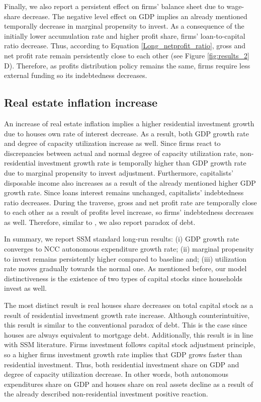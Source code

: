 \documentclass[11pt]{article}
\begin{document}
Finally, we also report a persistent effect on firms' balance sheet due to wage-share decrease.
The negative level effect on GDP implies an already mentioned temporally decrease in marginal propensity to invest.
As a consequence of the initially lower accumulation rate and higher profit share, firms' loan-to-capital ratio decrease.
Thus, according to Equation \ref{Long_netprofit_ratio}, gross and net profit rate remain persistently close to each other (see Figure \ref{fig:results_2} D).
Therefore, as profits distribution policy remains the same, firms require less external funding so its indebtedness decreases.


\subsection{Real estate inflation increase}
\label{sec:org183483f}
\label{sec:Exp2}


An increase of real estate inflation implies a higher residential investment growth due to houses own rate of interest decrease.
As a result, both GDP growth rate and degree of capacity utilization increase as well.
Since firms react to discrepancies between actual and normal degree of capacity utilization rate, non-residential investment growth rate 
is temporally higher than GDP growth rate due to marginal propensity to invest adjustment.
Furthermore, capitalists' disposable income also increases as a result of the already mentioned higher GDP growth rate.
Since loans interest remains unchanged, capitalists' indebtedness ratio decreases.
During the traverse, gross and net profit rate are temporally close to each other as a result of profits level increase, so firms' indebtedness decreases as well.
Therefore, similar to \textcite{mandarino-2020-worker-debt}, we also report paradox of debt.

In summary, we report SSM standard long-run results:
    (i) GDP growth rate converges to NCC autonomous expenditure growth rate;
    (ii) marginal propensity to invest remains persistently higher compared to baseline and;
    (iii) utilization rate moves gradually towards the normal one.
As mentioned before, our model distinctiveness is the existence of two types of capital stocks since households invest as well.


The most distinct result is real houses share decreases on total capital stock as a result of residential investment growth rate increase.
Although counterintuitive, this result is similar to the conventional paradox of debt.
This is the case since houses are always equivalent to  mortgage debt.
Additionally, this result is in line with SSM literature.
Firms investment follows capital stock adjustment principle, so a higher firms investment growth rate implies that
GDP grows faster than residential investment.
Thus, both residential investment share on GDP and degree of capacity  utilization decrease.
In other words, both autonomous expenditures share on GDP and houses share on real assets decline as a result of the already described non-residential investment positive reaction.
\end{document}
